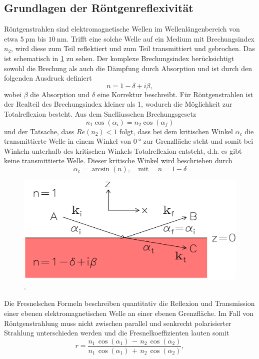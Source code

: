 \subsection{Grundlagen der Röntgenreflexivität} %
Röntgenstrahlen sind elektromagnetische Wellen im Wellenlängenbereich von etwa $\SI{5}{\pico\meter}$ bis $\SI{10}{\nano\meter}$.
Trifft eine solche Welle auf ein Medium mit Brechungsindex $n_2$, wird diese zum Teil reflektiert und zum Teil transmittiert und gebrochen. Das ist schematisch in \ref{fig:Brechungsindex} zu sehen. 
Der komplexe Brechungsindex berücksichtigt sowohl die Brechung als auch die Dämpfung durch Absorption und ist durch den folgenden Ausdruck definiert
\begin{equation}
    n = 1 - \delta + i \beta,
\end{equation}
wobei $\beta$ die Absorption und $\delta$ eine Korrektur beschreibt.
Für Röntgenstrahlen ist der Realteil des Brechungsindex kleiner als 1, wodurch die Möglichkeit zur Totalreflexion besteht.
Aus dem Snelliusschen Brechungsgesetz
\begin{equation}
    n_1 \cos(\alpha_i) = n_2 \cos(\alpha_f)
\end{equation}
und der Tatsache, dass $Re(n_2) < 1$ folgt, dass bei dem kritischen Winkel $\alpha_c$ die transmittierte Welle in einem Winkel von $\SI{0}{\degree}$ zur Grenzfläche steht und somit bei Winkeln unterhalb des kritischen Winkels Totalreflexion entsteht, d.h. es gibt keine transmittierte Welle.
Dieser kritische Winkel wird beschrieben durch
\begin{equation}
    \alpha_c = \arcsin(n), \quad \text{mit } \quad n= 1-\delta
    \label{eq:krit}
\end{equation}

\begin{figure}
    \centering
    \includegraphics[width=0.7\linewidth]{./figures/Brechungsindex.png}
    \caption{.}
    \label{fig:Brechungsindex}
\end{figure}

Die Fresnelschen Formeln beschreiben quantitativ die Reflexion und Transmission einer ebenen elektromagnetischen Welle an einer ebenen Grenzfläche. %
Im Fall von Röntgenstrahlung muss nicht zwischen parallel und senkrecht polarisierter Strahlung unterschieden werden und die Fresnelkoeffizienten lauten somit
\begin{equation}
    r = \frac{n_1 \, \cos(\alpha_1) \, - \, n_2 \, \cos(\alpha_2)}{n_1 \, \cos(\alpha_1) \, + \, n_2 \, \cos(\alpha_2)},
\end{equation}

